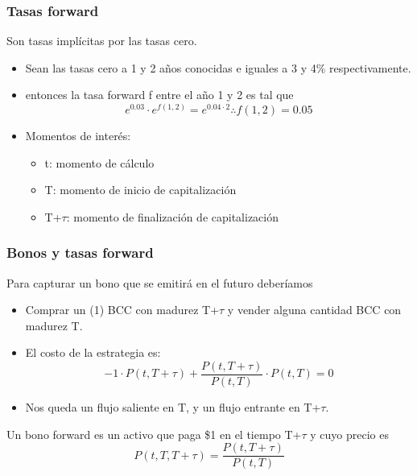
\begin{frame}
    \frametitle{Tasas forward}
    Son tasas implícitas por las tasas cero.
    \begin{itemize}
        \item Sean las tasas cero a 1 y 2 años conocidas e iguales a 3 y 4\% respectivamente.
        \item entonces la tasa forward f entre el año 1 y 2 es tal que
        \[e^{0.03} \cdot e^{f(1,2)} = e^{0.04 \cdot 2} \therefore f(1,2)=0.05 \]
        \item Momentos de interés:
        \begin{itemize}
            \item t: momento de cálculo
            \item T: momento de inicio de capitalización
            \item T+$\tau$: momento de finalización de capitalización
        \end{itemize}
    \end{itemize}
\end{frame}


\begin{frame}
    \frametitle{Bonos y tasas forward}
    Para capturar un bono que se emitirá en el futuro deberíamos
    \begin{itemize}
        \item Comprar un (1) BCC con madurez T+$\tau$ y vender alguna cantidad BCC con madurez T.
        \item El costo de la estrategia es:
        \begin{equation*}
            -1 \cdot P(t,T+\tau) + \frac{P(t,T + \tau)}{P(t,T)} \cdot P(t,T) = 0
        \end{equation*}
        \item Nos queda un flujo saliente en T, y un flujo entrante en T+$\tau$.
    \end{itemize}
    \begin{defin}
        Un bono forward es un activo que paga \$1 en el tiempo T+$\tau$ y cuyo precio es
        \begin{equation*}
            P(t,T, T+\tau) = \frac{P(t,T+\tau)}{P(t,T)}
        \end{equation*}
    \end{defin}
\end{frame}


